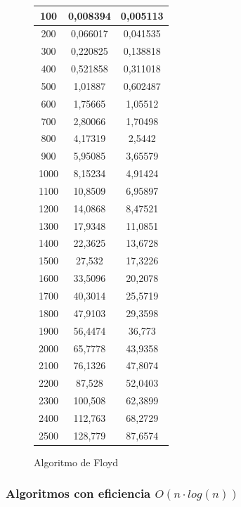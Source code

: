 \documentclass[12pt,spanish]{article}
\begin{document}
\begin{figure}[H]
\begin{tabular}{|c|c|c|}
\hline
100 & 0,008394 & 0,005113\\
\hline
200 & 0,066017 & 0,041535\\
\hline
300 & 0,220825 & 0,138818\\
\hline
400 & 0,521858 & 0,311018\\
\hline
500 & 1,01887 & 0,602487\\
\hline
600 & 1,75665 & 1,05512\\
\hline
700 & 2,80066 & 1,70498\\
\hline
800 & 4,17319 & 2,5442\\
\hline
900 & 5,95085 & 3,65579\\
\hline
1000 & 8,15234 & 4,91424\\
\hline
1100 & 10,8509 & 6,95897\\
\hline
1200 & 14,0868 & 8,47521\\
\hline
1300 & 17,9348 & 11,0851\\
\hline
1400 & 22,3625 & 13,6728\\
\hline
1500 & 27,532 & 17,3226\\
\hline
1600 & 33,5096 & 20,2078\\
\hline
1700 & 40,3014 & 25,5719\\
\hline
1800 & 47,9103 & 29,3598\\
\hline
1900 & 56,4474 & 36,773\\
\hline
2000 & 65,7778 & 43,9358\\
\hline
2100 & 76,1326 & 47,8074\\
\hline
2200 & 87,528 & 52,0403\\
\hline
2300 & 100,508 & 62,3899\\
\hline
2400 & 112,763 & 68,2729\\
\hline
2500 & 128,779 & 87,6574\\
\hline
\end{tabular}
\caption{Algoritmo de Floyd}
\end{figure}

\subsubsection{Algoritmos con eficiencia $O(n \cdot log(n))$}
\end{document}
